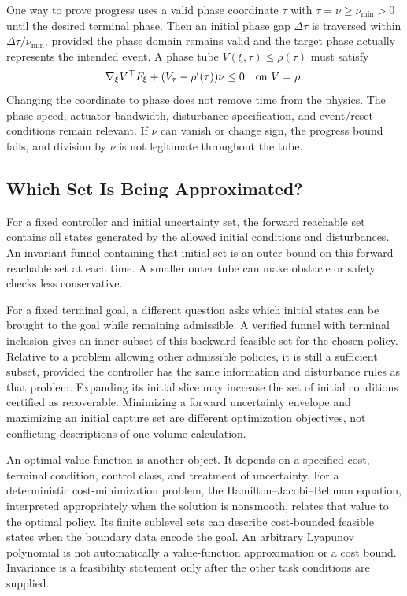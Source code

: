 \documentclass[12pt, openany]{book}
\theoremstyle{plain}
\begin{document}
One way to prove progress uses a valid phase coordinate $\tau$ with $\dot\tau=\nu\geq\nu_{\min}>0$ until the desired terminal phase. Then an initial phase gap $\Delta\tau$ is traversed within $\Delta\tau/\nu_{\min}$, provided the phase domain remains valid and the target phase actually represents the intended event. A phase tube $V(\xi,\tau)\leq\rho(\tau)$ must satisfy
\begin{equation}
 \nabla_\xi V^\top F_\xi+(V_\tau-\rho'(\tau))\nu\leq0
 \quad\hbox{on }V=\rho.
 \label{eq:funnel_phase_condition}
\end{equation}
Changing the coordinate to phase does not remove time from the physics. The phase speed, actuator bandwidth, disturbance specification, and event/reset conditions remain relevant. If $\nu$ can vanish or change sign, the progress bound fails, and division by $\nu$ is not legitimate throughout the tube.

\subsection{Which Set Is Being Approximated?}

For a fixed controller and initial uncertainty set, the forward reachable set contains all states generated by the allowed initial conditions and disturbances. An invariant funnel containing that initial set is an outer bound on this forward reachable set at each time. A smaller outer tube can make obstacle or safety checks less conservative.

For a fixed terminal goal, a different question asks which initial states can be brought to the goal while remaining admissible. A verified funnel with terminal inclusion gives an inner subset of this backward feasible set for the chosen policy. Relative to a problem allowing other admissible policies, it is still a sufficient subset, provided the controller has the same information and disturbance rules as that problem. Expanding its initial slice may increase the set of initial conditions certified as recoverable. Minimizing a forward uncertainty envelope and maximizing an initial capture set are different optimization objectives, not conflicting descriptions of one volume calculation.

An optimal value function is another object. It depends on a specified cost, terminal condition, control class, and treatment of uncertainty. For a deterministic cost-minimization problem, the Hamilton--Jacobi--Bellman equation, interpreted appropriately when the solution is nonsmooth, relates that value to the optimal policy. Its finite sublevel sets can describe cost-bounded feasible states when the boundary data encode the goal. An arbitrary Lyapunov polynomial is not automatically a value-function approximation or a cost bound. Invariance is a feasibility statement only after the other task conditions are supplied.
\end{document}
